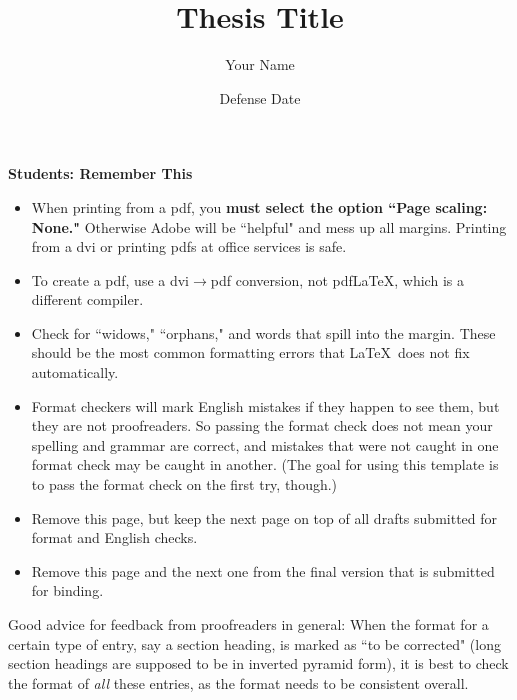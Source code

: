 \documentclass{LA_Tech}
\title{Thesis Title}
\author{Your Name}
\date{Defense Date}
\numberwithin{equation}{chapter}
\begin{document}
\thispagestyle{empty}


\begin{singlespace}

\centerline{\bf \Large Students: Remember This}



\begin{itemize}
\item
When printing from a pdf, you {\bf must select the option
``Page scaling: None."} Otherwise Adobe will be ``helpful" and
mess up all margins. Printing from a dvi or printing pdfs
at office services is safe.

\item
To create a pdf, use a dvi$\to $pdf conversion, not pdf\LaTeX, which is a
different compiler.


\item
Check for ``widows," ``orphans," and words that spill into the margin.
These should be the most common formatting errors that \LaTeX \
does not fix automatically.

\item
Format checkers will mark English mistakes if they happen to see them,
but they are not proofreaders. So passing the format check does not
mean your spelling and grammar are correct, and mistakes that were
not caught in one format check may be caught in another.
(The goal for using this template is to
pass the format check on the first try, though.)

\item
Remove this page, but keep the next
page on top of all drafts submitted for
format and English checks.

\item
Remove this page and the next one from the final version
that is submitted for binding.


\end{itemize}


Good advice for feedback from proofreaders in general:
When the format for a certain type of entry, say a section heading,
is marked as ``to be corrected" (long section headings are supposed
to be in inverted pyramid form), it is best to
check the format of {\em all} these entries, as
the format needs to be
consistent overall.


\end{singlespace}




\clearpage

\thispagestyle{empty}
\end{document}
